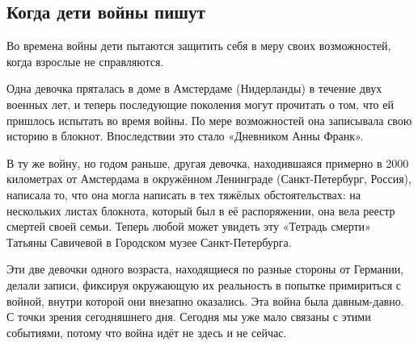  
 
 
 
 
\subsection{Когда дети войны пишут}
\label{sec:03_01_2022.stz.news.de.berliner_telegraph.1.deti_vojna}


\begin{zznagolos}
Во времена войны дети пытаются защитить себя в меру своих возможностей, когда
взрослые не справляются.	
\end{zznagolos}


Одна девочка пряталась в доме в Амстердаме (Нидерланды) в течение двух военных
лет, и теперь последующие поколения могут прочитать о том, что ей пришлось
испытать во время войны. По мере возможностей она записывала свою историю в
блокнот. Впоследствии это стало «Дневником Анны Франк».

В ту же войну, но годом раньше, другая девочка, находившаяся примерно в 2000
километрах от Амстердама в окружённом Ленинграде (Санкт-Петербург, Россия),
написала то, что она могла написать в тех тяжёлых обстоятельствах: на
нескольких листах блокнота, который был в её распоряжении, она вела реестр
смертей своей семьи. Теперь любой может увидеть эту «Тетрадь смерти» Татьяны
Савичевой в Городском музее Санкт-Петербурга.

Эти две девочки одного возраста, находящиеся по разные стороны от Германии,
делали записи, фиксируя окружающую их реальность в попытке примириться с
войной, внутри которой они внезапно оказались. Эта война была давным-давно. С
точки зрения сегодняшнего дня. Сегодня мы уже мало связаны с этими событиями,
потому что война идёт не здесь и не сейчас.


